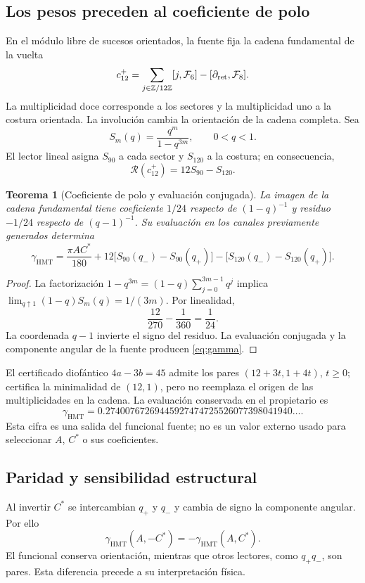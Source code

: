\documentclass[11pt,a4paper]{article}
\numberwithin{equation}{section}
\newtheorem{theorem}{Teorema}[section]
\theoremstyle{definition}
\newcommand{\HMT}{\mathrm{HMT}}
\newcommand{\Z}{\mathbb Z}
\begin{document}
\subsection{Los pesos preceden al coeficiente de polo}
En el módulo libre de sucesos orientados, la fuente fija la cadena
fundamental de la vuelta \cite{precedencia}
\[
c_{12}^{+}=
\sum_{j\in\Z/12\Z}[j,\mathcal F_6]
-[\partial_{\rm ret},\mathcal F_8].
\]
La multiplicidad doce corresponde a los sectores y la multiplicidad uno
a la costura orientada. La involución cambia la orientación de la cadena
completa. Sea
\[
S_m(q)=\frac{q^m}{1-q^{3m}},\qquad 0<q<1.
\]
El lector lineal asigna $S_{90}$ a cada sector y $S_{120}$ a la costura;
en consecuencia,
\[
\mathscr R(c_{12}^{+})=12S_{90}-S_{120}.
\]

\begin{theorem}[Coeficiente de polo y evaluación conjugada]
La imagen de la cadena fundamental tiene coeficiente $1/24$
respecto de $(1-q)^{-1}$ y residuo $-1/24$ respecto de $(q-1)^{-1}$.
Su evaluación en los canales previamente generados determina
\begin{equation}
\gamma_{\HMT}=
\frac{\pi AC^*}{180}
+12\bigl[S_{90}(q_-)-S_{90}(q_+)\bigr]
-\bigl[S_{120}(q_-)-S_{120}(q_+)\bigr].
\label{eq:gamma}
\end{equation}
\end{theorem}
\begin{proof}
La factorización $1-q^{3m}=(1-q)\sum_{j=0}^{3m-1}q^j$ implica
$\lim_{q\uparrow1}(1-q)S_m(q)=1/(3m)$. Por linealidad,
\[
\frac{12}{270}-\frac1{360}=\frac1{24}.
\]
La coordenada $q-1$ invierte el signo del residuo.
La evaluación conjugada y la componente angular de la fuente
producen \eqref{eq:gamma}.
\end{proof}

El certificado diofántico $4a-3b=45$ admite los pares
$(12+3t,1+4t)$, $t\ge0$; certifica la minimalidad de $(12,1)$,
pero no reemplaza el origen de las multiplicidades en la cadena.
La evaluación conservada en el propietario es
\[
\gamma_{\HMT}
=0.27400767269445927474725526077398041940\ldots.
\]
Esta cifra es una salida del funcional fuente; no es un valor externo
usado para seleccionar $A$, $C^*$ o sus coeficientes.

\subsection{Paridad y sensibilidad estructural}
Al invertir $C^*$ se intercambian $q_+$ y $q_-$ y cambia de signo
la componente angular. Por ello
\[
\gamma_{\HMT}(A,-C^*)=-\gamma_{\HMT}(A,C^*).
\]
El funcional conserva orientación, mientras que otros lectores,
como $q_+q_-$, son pares. Esta diferencia precede a su interpretación física.
\end{document}
